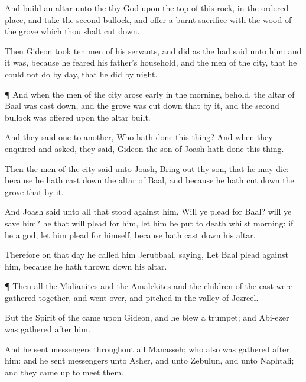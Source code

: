 {And
build an
altar unto the
{} thy
God upon the
top of this
rock, in the ordered
place, and
take the
second
bullock, and
offer a burnt
sacrifice with the
wood of the
grove which thou shalt cut
down.

Then
Gideon
took
ten
men of his
servants, and
did as the
{} had
said unto him: and
{} it was, because he
feared his
father’s
household, and the
men of the
city, that he could not
do
{} by
day, that he
did
{} by
night.


\par }{\PP {}¶ And when the
men of the
city arose
early in the
morning, behold, the
altar of
Baal was cast
down, and the
grove was cut
down that
{} by it, and the
second
bullock was
offered upon the
altar
{}
built.

And they
said
one to
another, Who hath
done this
thing? And when they
enquired and
asked, they
said,
Gideon the
son of
Joash hath
done this
thing.

Then the
men of the
city
said unto
Joash, Bring
out thy
son, that he may
die: because he hath cast
down the
altar of
Baal, and because he hath cut
down the
grove that
{} by it.

And
Joash
said unto all that
stood against him, Will ye
plead for
Baal? will ye
save him? he that will
plead for him, let him be put to
death whilst
{}
morning: if he
{} a
god, let him
plead for himself, because
{} hath cast
down his
altar.

Therefore on that
day he
called him
Jerubbaal,
saying, Let
Baal
plead against him, because he hath thrown
down his
altar.


\par }{\PP {}¶ Then all the
Midianites and the
Amalekites and the
children of the
east were
gathered
together, and went
over, and
pitched in the
valley of
Jezreel.

But the
Spirit of the
{}
came upon
Gideon, and he
blew a
trumpet; and
Abi-ezer was
gathered
after him.

And he
sent
messengers throughout all
Manasseh; who also was
gathered
after him: and he
sent
messengers unto
Asher, and unto
Zebulun, and unto
Naphtali; and they came
up to
meet them.


}
